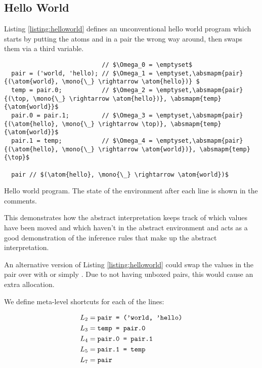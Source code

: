 \documentclass[12pt,twoside]{report}
\begin{document}
\subsection{Hello World}
\label{section:helloworld}
Listing \ref{listing:helloworld} defines an unconventional hello world program which starts by putting the atoms  and  in a pair the wrong way around, then swaps them via a third variable.

\begin{listing}
  \begin{verbatim}
                           // $\Omega_0 = \emptyset$
  pair = ('world, 'hello); // $\Omega_1 = \emptyset,\absmapm{pair}{(\atom{world}, \mono{\_} \rightarrow \atom{hello})} $
  temp = pair.0;           // $\Omega_2 = \emptyset,\absmapm{pair}{(\top, \mono{\_} \rightarrow \atom{hello})}, \absmapm{temp}{\atom{world}}$
  pair.0 = pair.1;         // $\Omega_3 = \emptyset,\absmapm{pair}{(\atom{hello}, \mono{\_} \rightarrow \top)}, \absmapm{temp}{\atom{world}}$
  pair.1 = temp;           // $\Omega_4 = \emptyset,\absmapm{pair}{(\atom{hello}, \mono{\_} \rightarrow \atom{world})}, \absmapm{temp}{\top}$

  pair // $(\atom{hello}, \mono{\_} \rightarrow \atom{world})$
  \end{verbatim}
  \caption{Hello world program. The state of the environment after each line is shown in the comments.}
  \label{listing:helloworld}
\end{listing}

This demonstrates how the abstract interpretation keeps track of which values have been moved and which haven't in the abstract environment and acts as a good demonstration of the inference rules that make up the abstract interpretation.

An alternative version of Listing \ref{listing:helloworld} could swap the values in the pair over with  or simply . Due to not having unboxed pairs, this would cause an extra allocation.

We define meta-level shortcuts for each of the lines:

\[\begin{aligned}
L_2 &= \text{\texttt{pair = ('world, 'hello)}} \\
L_3 &= \text{\texttt{temp = pair.0}} \\
L_4 &= \text{\texttt{pair.0 = pair.1}} \\
L_5 &= \text{\texttt{pair.1 = temp}} \\
L_7 &= \text{\texttt{pair}} \\
\end{aligned}\]
\end{document}
